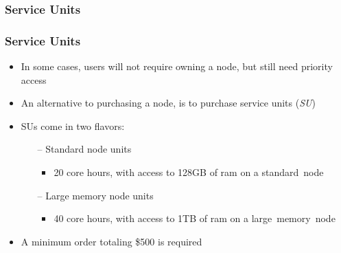 \subsubsection{Service Units}
\begin{frame}	
	\frametitle{Service Units}
	\begin{itemize}
	 \item In some cases, users will not require owning a node, but still need priority access
	 \item An alternative to purchasing a node, is to purchase service units (\emph{SU})
	 \item SUs come in two flavors:
		 \begin{itemize}
			 \item[--] Standard node units 
				\begin{itemize}
					\item 20 core hours, with access to 128GB of ram on a standard~node
				\end{itemize}
			 \item[--] Large memory node units
				\begin{itemize}
					\item 40 core hours, with access to 1TB of ram on a large~memory~node
				\end{itemize}
		 \end{itemize}
	 \item A minimum order totaling \$500 is required
	\end{itemize}
\end{frame}


